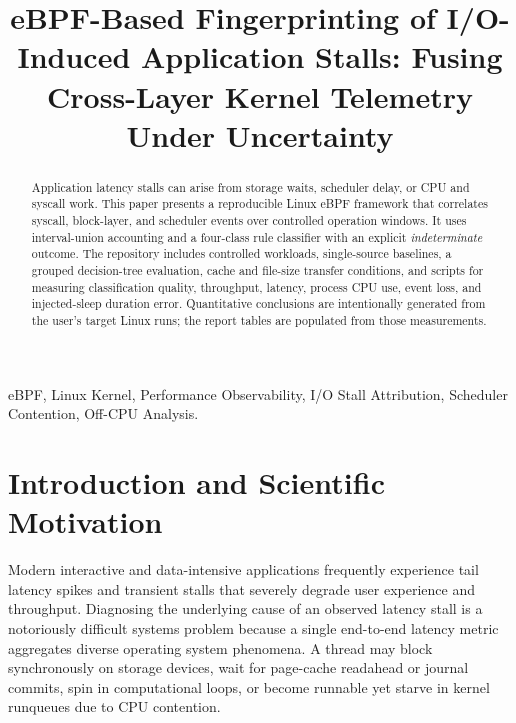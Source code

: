 \documentclass[conference]{IEEEtran}
\begin{document}
\title{eBPF-Based Fingerprinting of I/O-Induced Application Stalls: Fusing Cross-Layer Kernel Telemetry Under Uncertainty}

\author{
}

\maketitle

\begin{abstract}
Application latency stalls can arise from storage waits, scheduler delay, or CPU and syscall work. This paper presents a reproducible Linux eBPF framework that correlates syscall, block-layer, and scheduler events over controlled operation windows. It uses interval-union accounting and a four-class rule classifier with an explicit \textit{indeterminate} outcome. The repository includes controlled workloads, single-source baselines, a grouped decision-tree evaluation, cache and file-size transfer conditions, and scripts for measuring classification quality, throughput, latency, process CPU use, event loss, and injected-sleep duration error. Quantitative conclusions are intentionally generated from the user's target Linux runs; the report tables are populated from those measurements.
\end{abstract}

\begin{IEEEkeywords}
eBPF, Linux Kernel, Performance Observability, I/O Stall Attribution, Scheduler Contention, Off-CPU Analysis.
\end{IEEEkeywords}

\section{Introduction and Scientific Motivation}
Modern interactive and data-intensive applications frequently experience tail latency spikes and transient stalls that severely degrade user experience and throughput. Diagnosing the underlying cause of an observed latency stall is a notoriously difficult systems problem because a single end-to-end latency metric aggregates diverse operating system phenomena. A thread may block synchronously on storage devices, wait for page-cache readahead or journal commits, spin in computational loops, or become runnable yet starve in kernel runqueues due to CPU contention.
\end{document}
